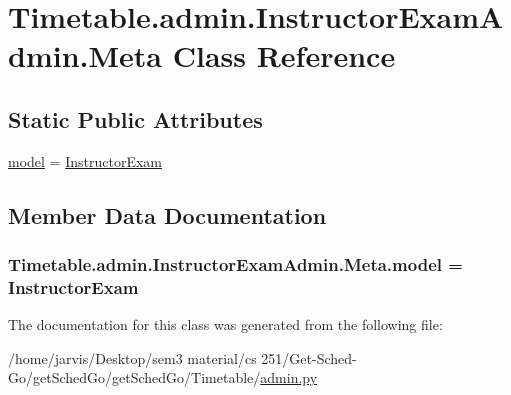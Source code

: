 \hypertarget{classTimetable_1_1admin_1_1InstructorExamAdmin_1_1Meta}{}\section{Timetable.\+admin.\+Instructor\+Exam\+Admin.\+Meta Class Reference}
\label{classTimetable_1_1admin_1_1InstructorExamAdmin_1_1Meta}
\subsection*{Static Public Attributes}
\begin{DoxyCompactItemize}
\item 
\hyperlink{classTimetable_1_1admin_1_1InstructorExamAdmin_1_1Meta_aafdfc8c32c22f5a257b02a07402b4fd1}{model} = \hyperlink{classTimetable_1_1models_1_1InstructorExam}{Instructor\+Exam}
\end{DoxyCompactItemize}


\subsection{Member Data Documentation}
\subsubsection[{\texorpdfstring{model}{model}}]{\setlength{\rightskip}{0pt plus 5cm}Timetable.\+admin.\+Instructor\+Exam\+Admin.\+Meta.\+model = {\bf Instructor\+Exam}\hspace{0.3cm}{\ttfamily [static]}}\hypertarget{classTimetable_1_1admin_1_1InstructorExamAdmin_1_1Meta_aafdfc8c32c22f5a257b02a07402b4fd1}{}\label{classTimetable_1_1admin_1_1InstructorExamAdmin_1_1Meta_aafdfc8c32c22f5a257b02a07402b4fd1}


The documentation for this class was generated from the following file\+:\begin{DoxyCompactItemize}
\item 
/home/jarvis/\+Desktop/sem3 material/cs 251/\+Get-\/\+Sched-\/\+Go/get\+Sched\+Go/get\+Sched\+Go/\+Timetable/\hyperlink{Timetable_2admin_8py}{admin.\+py}\end{DoxyCompactItemize}

